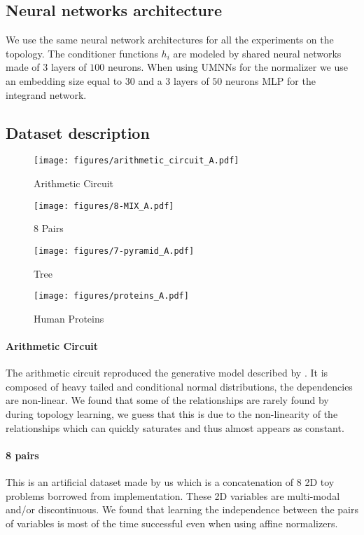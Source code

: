 \subsection{Neural networks architecture}
We use the same neural network architectures for all the experiments on the topology. The conditioner functions $h_i$ are modeled by shared neural networks made of 3 layers of $100$ neurons. When using UMNNs for the normalizer we use an embedding size equal to $30$ and a 3 layers of $50$ neurons MLP for the integrand network.
\subsection{Dataset description}\label{app:top_dataset_descri}
\begin{figure*}
\caption{Ground truth adjacency matrices. Black squares denote direct connections and in light grey is their transposed.}
\centering
\begin{subfigure}[t]{.2\textwidth}
\texttt{[image: figures/arithmetic\_circuit\_A.pdf]}
\caption{Arithmetic Circuit}
\end{subfigure}
\begin{subfigure}[t]{.2\textwidth}
\texttt{[image: figures/8-MIX\_A.pdf]}
\caption{8 Pairs}
\end{subfigure}
\begin{subfigure}[t]{.2\textwidth}
\texttt{[image: figures/7-pyramid\_A.pdf]}
\caption{Tree}
\end{subfigure}
\begin{subfigure}[t]{.2\textwidth}
\texttt{[image: figures/proteins\_A.pdf]}
\caption{Human Proteins}
\end{subfigure}
\end{figure*}
\paragraph{Arithmetic Circuit}
The arithmetic circuit reproduced the generative model described by \cite{wood}. It is composed of heavy tailed and conditional normal distributions, the dependencies are non-linear. We found that some of the relationships are rarely found by during topology learning, we guess that this is due to the non-linearity of the relationships which can quickly saturates and thus almost appears as constant.
\paragraph{8 pairs}
This is an artificial dataset made by us which is a concatenation of 8 2D toy problems borrowed from \cite{ffjord} implementation. These 2D variables are multi-modal and/or discontinuous. We found that learning the independence between the pairs of variables is most of the time successful even when using affine normalizers.
